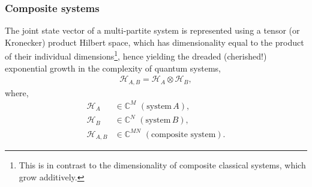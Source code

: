 %
%

\subsubsection{Composite systems}

The joint state vector of a multi-partite system is represented using a tensor (or Kronecker) product Hilbert space, which has dimensionality equal to the product of their individual dimensions\footnote{This is in contrast to the dimensionality of composite classical systems, which grow additively.}, hence yielding the dreaded (cherished!) exponential growth in the complexity of quantum systems,
\begin{align}
\mathcal{H}_{A,B} = \mathcal{H}_A\otimes \mathcal{H}_B,	
\end{align}
where,
\begin{align}
\mathcal{H}_A &\in\mathbb{C}^M\,\,(\mathrm{system}\,A),\nonumber\\
\mathcal{H}_B &\in\mathbb{C}^N\,\,(\mathrm{system}\,B),\nonumber\\
\mathcal{H}_{A,B} &\in\mathbb{C}^{MN}\,\,(\mathrm{composite\,\,system}).	
\end{align}

